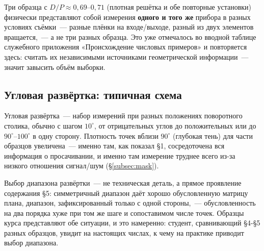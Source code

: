 \begin{warning}
Три образца с $D/P\approx0{,}69$--$0{,}71$ (плотная решётка и обе повторные установки) физически
представляют собой измерения \textbf{одного и того же} прибора в разных условиях съёмки~---
разные плёнки на входе/выходе, разный из двух элементов вращается,~--- а не три разных образца.
Это уже отмечалось во вводной таблице служебного приложения «Происхождение числовых примеров» и
повторяется здесь: считать их независимыми источниками геометрической информации~--- значит
завысить объём выборки.
\end{warning}

\subsection*{Угловая развёртка: типичная схема}

\begin{intuition}
Угловая развёртка~--- набор измерений при разных положениях поворотного столика, обычно с шагом
$10^\circ$, от отрицательных углов до положительных или до $90^\circ$--$100^\circ$ в одну сторону.
Плотность точек вблизи $90^\circ$ (глубокая тень) для части образцов увеличена~--- именно там,
как показал §1, сосредоточена вся информация о просачивании, и именно там измерение труднее всего
из-за низкого отношения сигнал/шум (§\ref{subsec:mask}).
\end{intuition}

\noindent
Выбор диапазона развёртки~--- не техническая деталь, а прямое проявление содержания §5:
симметричный диапазон даёт хорошо обусловленную матрицу плана, диапазон, зафиксированный только с
одной стороны,~--- обусловленность на два порядка хуже при том же шаге и сопоставимом числе точек.
Образцы курса представляют обе ситуации, и это намеренно: студент, сравнивающий §4-§5 разных
образцов, увидит на настоящих числах, к чему на практике приводит выбор диапазона.

\clearpage
